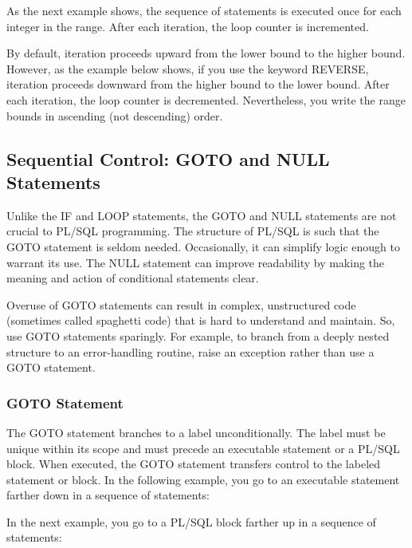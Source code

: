 As the next example shows, the sequence of statements is executed once for each integer in the range. After each iteration, the loop counter is incremented.

By default, iteration proceeds upward from the lower bound to the higher bound. However, as the example below shows, if you use the keyword REVERSE, iteration proceeds downward from the higher bound to the lower bound. After each iteration, the loop counter is decremented. Nevertheless, you write the range bounds in ascending (not descending) order.


\subsection{Sequential Control: GOTO and NULL Statements}
Unlike the IF and LOOP statements, the GOTO and NULL statements are not crucial to PL/SQL programming. The structure of PL/SQL is such that the GOTO statement is seldom needed. Occasionally, it can simplify logic enough to warrant its use. The NULL statement can improve readability by making the meaning and action of conditional statements clear.

Overuse of GOTO statements can result in complex, unstructured code (sometimes called spaghetti code) that is hard to understand and maintain. So, use GOTO statements sparingly. For example, to branch from a deeply nested structure to an error-handling routine, raise an exception rather than use a GOTO statement.
\subsubsection{GOTO Statement}
The GOTO statement branches to a label unconditionally. The label must be unique within its scope and must precede an executable statement or a PL/SQL block. When executed, the GOTO statement transfers control to the labeled statement or block. In the following example, you go to an executable statement farther down in a sequence of statements:

In the next example, you go to a PL/SQL block farther up in a sequence of statements:


